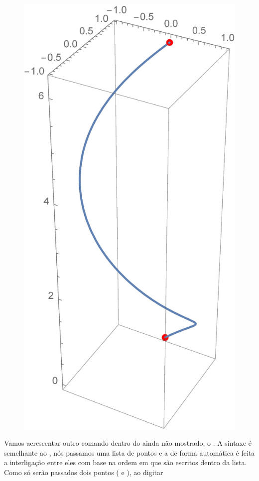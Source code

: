 \documentclass[a4paper, 12pt]{article}
\begin{document}
\begin{figure}[!h]
	\centering
	\includegraphics[scale=.5]{images/ShowParametricPlot}
\end{figure}

Vamos acrescentar outro comando dentro do  ainda não mostrado, o . A sintaxe é semelhante ao , nós passamos uma lista de pontos e a de forma automática é feita a interligação entre eles com base na ordem em que são escritos dentro da lista. Como só serão passados dois pontos ( e ), ao digitar
\end{document}

